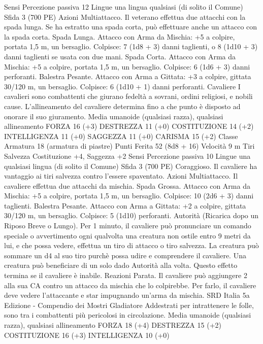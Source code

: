\begin{multicols}{2}
Sensi Percezione passiva 12
Lingue una lingua qualsiasi (di solito il Comune)
Sfida 3 (700 PE)
Azioni
Multiattacco. Il veterano effettua due attacchi con la spada
lunga. Se ha estratto una spada corta, può effettuare anche un
attacco con la spada corta.
Spada Lunga. Attacco con Arma da Mischia: +5 a colpire,
portata 1,5 m, un bersaglio.
Colpisce: 7 (1d8 + 3) danni taglienti, o 8 (1d10 + 3) danni
taglienti se usata con due mani.
Spada Corta. Attacco con Arma da Mischia: +5 a colpire, portata
1,5 m, un bersaglio.
Colpisce: 6 (1d6 + 3) danni perforanti.
Balestra Pesante. Attacco con Arma a Gittata: +3 a colpire,
gittata 30/120 m, un bersaglio.
Colpisce: 6 (1d10 + 1) danni perforanti.
Cavaliere
I cavalieri sono combattenti che giurano fedeltà a
sovrani, ordini religiosi, e nobili cause. L’allineamento
del cavaliere determina fino a che punto è disposto ad
onorare il suo giuramento.
Media umanoide (qualsiasi razza), qualsiasi allineamento
FORZA 16 (+3)
DESTREZZA 11 (+0)
COSTITUZIONE 14 (+2)
INTELLIGENZA 11 (+0)
SAGGEZZA 11 (+0)
CARISMA 15 (+2)
Classe Armatura 18 (armatura di piastre)
Punti Ferita 52 (8d8 + 16)
Velocità 9 m
Tiri Salvezza Costituzione +4, Saggezza +2
Sensi Percezione passiva 10
Lingue una qualsiasi lingua (di solito il Comune)
Sfida 3 (700 PE)
Coraggioso. Il cavaliere ha vantaggio ai tiri salvezza contro
l’essere spaventato.
Azioni
Multiattacco. Il cavaliere effettua due attacchi da mischia.
Spada Grossa. Attacco con Arma da Mischia: +5 a colpire,
portata 1,5 m, un bersaglio.
Colpisce: 10 (2d6 + 3) danni taglienti.
Balestra Pesante. Attacco con Arma a Gittata: +2 a colpire,
gittata 30/120 m, un bersaglio.
Colpisce: 5 (1d10) perforanti.
Autorità (Ricarica dopo un Riposo Breve o Lungo). Per 1
minuto, il cavaliere può pronunciare un comando speciale o
avvertimento ogni qualvolta una creatura non ostile entro 9 metri
da lui, e che possa vedere, effettua un tiro di attacco o tiro
salvezza. La creatura può sommare un d4 al suo tiro purchè
possa udire e comprendere il cavaliere. Una creatura può
beneficiare di un solo dado Autorità alla volta. Questo effetto
termina se il cavaliere è inabile.
Reazioni
Parata. Il cavaliere può aggiungere 2 alla sua CA contro un
attacco da mischia che lo colpirebbe. Per farlo, il cavaliere deve
vedere l’attaccante e star impugnando un’arma da mischia.
SRD Italia 5a Edizione - Compendio dei Mostri
Gladiatore
Addestrati per intrattenere le folle, sono tra i
combattenti più pericolosi in circolazione.
Media umanoide (qualsiasi razza), qualsiasi allineamento
FORZA 18 (+4)
DESTREZZA 15 (+2)
COSTITUZIONE 16 (+3)
INTELLIGENZA 10 (+0)

\end{multicols}

